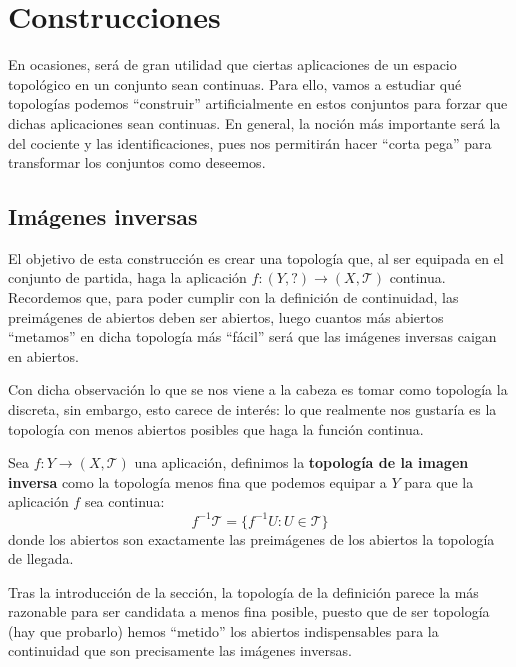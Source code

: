\chapter{Construcciones}%
\label{cha:construcciones}
En ocasiones, será de gran utilidad que ciertas aplicaciones de un espacio topológico en un conjunto sean continuas. Para ello, vamos a estudiar qué topologías podemos ``construir'' artificialmente en estos conjuntos para forzar que dichas aplicaciones sean continuas. En general, la noción más importante será la del cociente y las identificaciones, pues nos permitirán hacer ``corta pega'' para transformar los conjuntos como deseemos.

\section{Imágenes inversas}%
\label{sec:imagenes_inversas}
El objetivo de esta construcción es crear una topología que, al ser equipada en el conjunto de partida, haga la aplicación $f: (Y, ?) \rightarrow \left( X, \mathcal{T} \right)$ continua. Recordemos que, para poder cumplir con la definición de continuidad, las preimágenes de abiertos deben ser abiertos, luego cuantos más abiertos ``metamos'' en dicha topología más ``fácil'' será que las imágenes inversas caigan en abiertos.

Con dicha observación lo que se nos viene a la cabeza es tomar como topología la discreta, sin embargo, esto carece de interés: lo que realmente nos gustaría es la topología con menos abiertos posibles que haga la función continua.

\begin{defi}
Sea $f: Y \rightarrow (X,\mathcal{T})$ una aplicación, definimos la \textbf{topología de la imagen inversa} como la topología menos fina que podemos equipar a $Y$ para que la aplicación $f$ sea continua:
$$
f^{-1} \mathcal{T} = \{f^{-1}U: U \in \mathcal{T}\}
$$
donde los abiertos son exactamente las preimágenes de los abiertos la topología de llegada.
\end{defi}

\begin{obs}
Tras la introducción de la sección, la topología de la definición parece la más razonable para ser candidata a menos fina posible, puesto que de ser topología (hay que probarlo) hemos ``metido'' los abiertos indispensables para la continuidad que son precisamente las imágenes inversas.
\end{obs}

